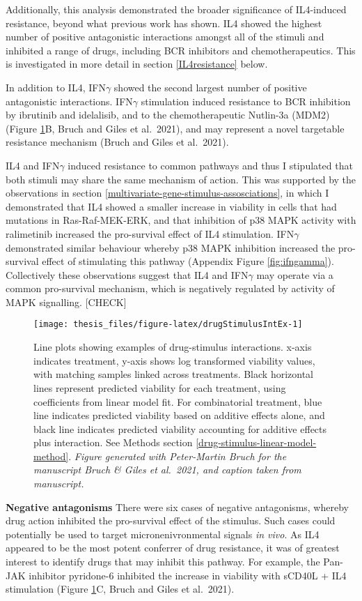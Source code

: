 \documentclass[11pt, a4paper, twosided]{book}
\begin{document}
Additionally, this analysis demonstrated the broader significance of IL4-induced resistance, beyond what previous work has shown. IL4 showed the highest number of positive antagonistic interactions amongst all of the stimuli and inhibited a range of drugs, including BCR inhibitors and chemotherapeutics. This is investigated in more detail in section \ref{IL4resistance} below.

In addition to IL4, IFN\(\gamma\) showed the second largest number of positive antagonistic interactions. IFN\(\gamma\) stimulation induced resistance to BCR inhibition by ibrutinib and idelalisib, and to the chemotherapeutic Nutlin-3a (MDM2) (Figure \ref{fig:drugStimulusIntEx}B, Bruch and Giles et al.~2021), and may represent a novel targetable resistance mechanism (Bruch and Giles et al.~2021).

IL4 and IFN\(\gamma\) induced resistance to common pathways and thus I stipulated that both stimuli may share the same mechanism of action. This was supported by the observations in section \ref{multivariate-gene-stimulus-assosciations}, in which I demonstrated that IL4 showed a smaller increase in viability in cells that had mutations in Ras-Raf-MEK-ERK, and that inhibition of p38 MAPK activity with ralimetinib increased the pro-survival effect of IL4 stimulation. IFN\(\gamma\) demonstrated similar behaviour whereby p38 MAPK inhibition increased the pro-survival effect of stimulating this pathway (Appendix Figure \ref{fig:ifngamma}). Collectively these observations suggest that IL4 and IFN\(\gamma\) may operate via a common pro-survival mechanism, which is negatively regulated by activity of MAPK signalling. {[}CHECK{]}


\begin{figure}

{\centering \texttt{[image: thesis\_files/figure-latex/drugStimulusIntEx-1]} 

}

\caption{Line plots showing examples of drug-stimulus interactions. x-axis indicates treatment, y-axis shows log transformed viability values, with matching samples linked across treatments. Black horizontal lines represent predicted viability for each treatment, using coefficients from linear model fit. For combinatorial treatment, blue line indicates predicted viability based on additive effects alone, and black line indicates predicted viability accounting for additive effects plus interaction. See Methods section \ref{drug-stimulus-linear-model-method}. \emph{Figure generated with Peter-Martin Bruch for the manuscript Bruch \& Giles et al.~2021, and caption taken from manuscript.}}\label{fig:drugStimulusIntEx}
\end{figure}
\textbf{Negative antagonisms} There were six cases of negative antagonisms, whereby drug action inhibited the pro-survival effect of the stimulus. Such cases could potentially be used to target micronenivronmental signals \emph{in vivo}. As IL4 appeared to be the most potent conferrer of drug resistance, it was of greatest interest to identify drugs that may inhibit this pathway. For example, the Pan-JAK inhibitor pyridone-6 inhibited the increase in viability with sCD40L + IL4 stimulation (Figure \ref{fig:drugStimulusIntEx}C, Bruch and Giles et al.~2021).
\end{document}
